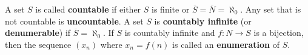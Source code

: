 A set \(S\) is called \textbf{countable} if either \(S\) is finite or \(\overline{S} = \overline{N} = \aleph_0\). Any set that is not countable is \textbf{uncountable}. A set \(S\) is \textbf{countably infinite} (or \textbf{denumerable}) if \(\overline{S} = \aleph_0\). If \(S\) is countably infinite and \(f: N \to S\) is a bijection, then the sequence \((x_n)\) where \(x_n = f(n)\) is called an \textbf{enumeration} of \(S\).